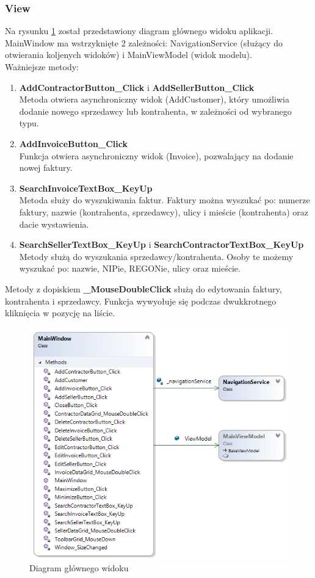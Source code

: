 \subsubsection{View}
Na rysunku \ref{fig:MainWindowDiagram} został przedstawiony diagram głównego widoku aplikacji. MainWindow ma wstrzyknięte 2 zależności: NavigationService (służący do otwierania koljenych widoków) i MainViewModel (widok modelu). 
\\
Ważniejsze metody:
\begin{enumerate}
    \item \textbf{AddContractorButton\_Click} i \textbf{AddSellerButton\_Click} \\
    Metoda otwiera asynchroniczny widok (AddCustomer), który umożliwia dodanie nowego sprzedawcy lub kontrahenta, w zależności od wybranego typu.
    \item \textbf{AddInvoiceButton\_Click} \\
    Funkcja otwiera asynchroniczny widok (Invoice), pozwalający na dodanie nowej faktury.
    \item \textbf{SearchInvoiceTextBox\_KeyUp} \\
    Metoda służy do wyszukiwania faktur. Faktury można wyszukać po: numerze faktury, nazwie (kontrahenta, sprzedawcy), ulicy i mieście (kontrahenta) oraz dacie wystawienia.
    \item \textbf{SearchSellerTextBox\_KeyUp} i \textbf{SearchContractorTextBox\_KeyUp} \\
    Metody służą do wyszukania sprzedawcy/kontrahenta. Osoby te możemy wyszukać po: nazwie, NIPie, REGONie, ulicy oraz mieście.
\end{enumerate}

Metody z dopiskiem \textbf{\_MouseDoubleClick} służą do edytowania faktury, kontrahenta i sprzedawcy. Funkcja wywyołuje się podczas dwukkrotnego kliknięcia w pozycję na liście.

\begin{figure}[ht!]
\centering
  \includegraphics[width=0.7\linewidth]{Rysunki/MainWindowDiagram.png}
  \caption{Diagram głównego widoku}
  \label{fig:MainWindowDiagram}
\end{figure}

